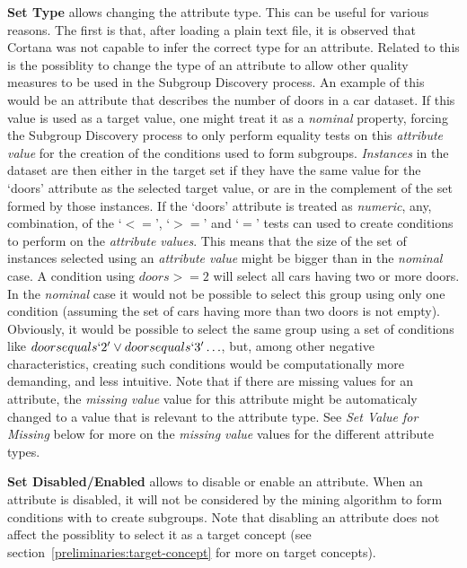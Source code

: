 \documentclass{article}
\begin{document}
\textbf{Set Type} allows changing the attribute type.
This can be useful for various reasons.
The first is that, after loading a plain text file, it is observed that Cortana was not capable to infer the correct type for an attribute.
Related to this is the possiblity to change the type of an attribute to allow other quality measures to be used in the Subgroup Discovery process.
An example of this would be an attribute that describes the number of doors in a car dataset.
If this value is used as a target value, one might treat it as a \emph{nominal} property, forcing the Subgroup Discovery process to only perform equality tests on this \emph{attribute value} for the creation of the conditions used to form subgroups.
\emph{Instances} in the dataset are then either in the target set if they have the same value for the `doors' attribute as the selected target value, or are in the complement of the set formed by those instances.
If the `doors' attribute is treated as \emph{numeric}, any, combination, of the `$<=$', `$>=$' and `$=$' tests can used to create conditions to perform on the \emph{attribute values}.
This means that the size of the set of instances selected using an \emph{attribute value} might be bigger than in the \emph{nominal} case.
A condition using $doors >= 2$ will select all cars having two or more doors.
In the \emph{nominal} case it would not be possible to select this group using only one condition (assuming the set of cars having more than two doors is not empty).
Obviously, it would be possible to select the same group using a set of conditions like $doors equals `2' \vee doors equals `3' \ldots$, but, among other negative characteristics, creating such conditions would be computationally more demanding, and less intuitive.
Note that if there are missing values for an attribute, the \emph{missing value} value for this attribute might be automaticaly changed to a value that is relevant to the attribute type.
See \emph{Set Value for Missing} below for more on the \emph{missing value} values for the different attribute types.

\textbf{Set Disabled/Enabled} allows to disable or enable an attribute.
When an attribute is disabled, it will not be considered by the mining algorithm to form conditions with to create subgroups.
Note that disabling an attribute does not affect the possiblity to select it as a target concept (see section~\ref{preliminaries:target-concept} for more on target concepts).
\end{document}
